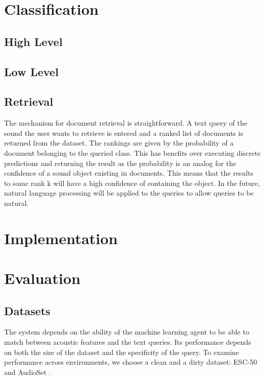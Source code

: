 \section{Classification}
\subsection{High Level}

\subsection{Low Level}

\subsection{Retrieval}
The mechanism for document retrieval is straightforward. A text query of the sound the user wants to retrieve is entered and a ranked list of documents is returned from the dataset. The rankings are given by the probability of a document belonging to the queried class. This has benefits over executing discrete predictions and returning the result as the probability is an analog for the confidence of a sound object existing in documents. This means that the results to some rank k will have a high confidence of containing the object. In the future, natural language processing will be applied to the queries to allow queries to be natural.

\section{Implementation}

\section{Evaluation}

\subsection{Datasets}
The system depends on the ability of the machine learning agent to be able to match between acoustic features and the text queries. Its performance depends on both the size of the dataset and the specificity of the query. To examine performance across environments, we choose a clean and a dirty dataset: ESC-50 \cite{Piczak2015} and AudioSet \cite{Gemmeke2017}.


